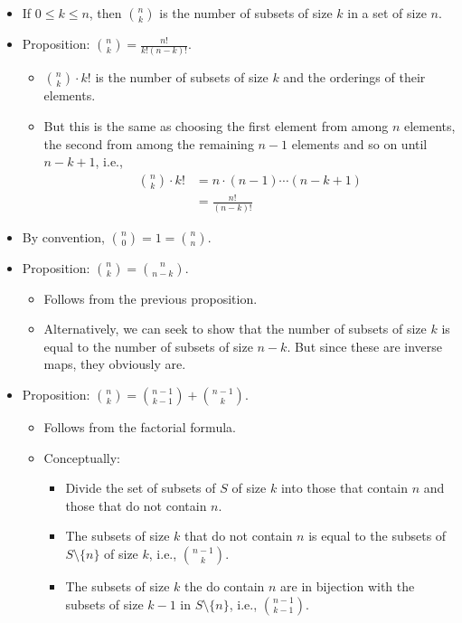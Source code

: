 \documentclass[../main.tex]{subfiles}
\begin{document}
\begin{itemize}
    \item If $0\leq k\leq n$, then $\binom{n}{k}$ is the number of subsets of size $k$ in a set of size $n$.
    \item Proposition: $\binom{n}{k}=\frac{n!}{k!(n-k)!}$.
    \begin{itemize}
        \item $\binom{n}{k}\cdot k!$ is the number of subsets of size $k$ and the orderings of their elements.
        \item But this is the same as choosing the first element from among $n$ elements, the second from among the remaining $n-1$ elements and so on until $n-k+1$, i.e.,
        \begin{align*}
            \binom{n}{k}\cdot k! &= n\cdot(n-1)\cdots(n-k+1)\\
            &= \frac{n!}{(n-k)!}
        \end{align*}
    \end{itemize}
    \item By convention, $\binom{n}{0}=1=\binom{n}{n}$.
    \item Proposition: $\binom{n}{k}=\binom{n}{n-k}$.
    \begin{itemize}
        \item Follows from the previous proposition.
        \item Alternatively, we can seek to show that the number of subsets of size $k$ is equal to the number of subsets of size $n-k$. But since these are inverse maps, they obviously are.
    \end{itemize}
    \item Proposition: $\binom{n}{k}=\binom{n-1}{k-1}+\binom{n-1}{k}$.
    \begin{itemize}
        \item Follows from the factorial formula.
        \item Conceptually:
        \begin{itemize}
            \item Divide the set of subsets of $S$ of size $k$ into those that contain $n$ and those that do not contain $n$.
            \item The subsets of size $k$ that do not contain $n$ is equal to the subsets of $S\setminus\{n\}$ of size $k$, i.e., $\binom{n-1}{k}$.
            \item The subsets of size $k$ the do contain $n$ are in bijection with the subsets of size $k-1$ in $S\setminus\{n\}$, i.e., $\binom{n-1}{k-1}$.
        \end{itemize}

\end{itemize}
\end{itemize}
\end{document}
